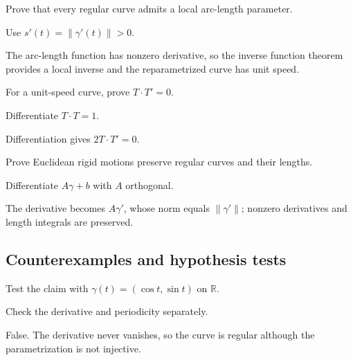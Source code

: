\begin{exercise}\label{exr:vii12-ped-07}
Prove that every regular curve admits a local arc-length parameter.
\end{exercise}
\begin{hint}
Use \(s'(t)=\|\gamma'(t)\|>0\).
\end{hint}
\begin{solution}
The arc-length function has nonzero derivative, so the inverse function theorem provides a local inverse and the reparametrized curve has unit speed.
\end{solution}

\begin{exercise}\label{exr:vii12-ped-08}
For a unit-speed curve, prove \(T\cdot T'=0\).
\end{exercise}
\begin{hint}
Differentiate \(T\cdot T=1\).
\end{hint}
\begin{solution}
Differentiation gives \(2T\cdot T'=0\).
\end{solution}

\begin{exercise}\label{exr:vii12-ped-09}
Prove Euclidean rigid motions preserve regular curves and their lengths.
\end{exercise}
\begin{hint}
Differentiate \(A\gamma+b\) with \(A\) orthogonal.
\end{hint}
\begin{solution}
The derivative becomes \(A\gamma'\), whose norm equals \(\|\gamma'\|\); nonzero derivatives and length integrals are preserved.
\end{solution}

\subsection*{Counterexamples and hypothesis tests}

\begin{exercise}\label{exr:vii12-ped-10}
Test the claim with \(\gamma(t)=(\cos t,\sin t)\) on \(\mathbb R\).
\end{exercise}
\begin{hint}
Check the derivative and periodicity separately.
\end{hint}
\begin{solution}
False.  The derivative never vanishes, so the curve is regular although the parametrization is not injective.
\end{solution}

